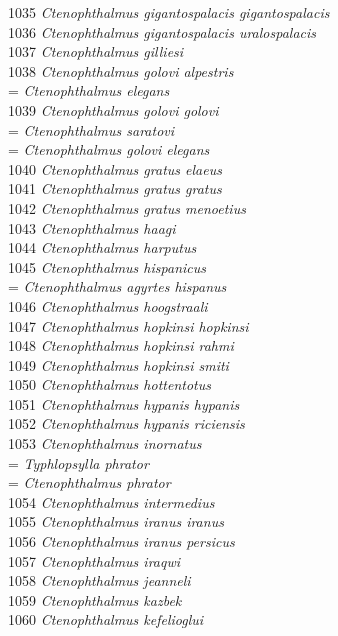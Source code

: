 \documentclass[
]{article}
\begin{document}
1035 \emph{Ctenophthalmus gigantospalacis gigantospalacis}\\
1036 \emph{Ctenophthalmus gigantospalacis uralospalacis}\\
1037 \emph{Ctenophthalmus gilliesi}\\
1038 \emph{Ctenophthalmus golovi alpestris}\\
= \emph{Ctenophthalmus elegans}\\
1039 \emph{Ctenophthalmus golovi golovi}\\
= \emph{Ctenophthalmus saratovi}\\
= \emph{Ctenophthalmus golovi elegans}\\
1040 \emph{Ctenophthalmus gratus elaeus}\\
1041 \emph{Ctenophthalmus gratus gratus}\\
1042 \emph{Ctenophthalmus gratus menoetius}\\
1043 \emph{Ctenophthalmus haagi}\\
1044 \emph{Ctenophthalmus harputus}\\
1045 \emph{Ctenophthalmus hispanicus}\\
= \emph{Ctenophthalmus agyrtes hispanus}\\
1046 \emph{Ctenophthalmus hoogstraali}\\
1047 \emph{Ctenophthalmus hopkinsi hopkinsi}\\
1048 \emph{Ctenophthalmus hopkinsi rahmi}\\
1049 \emph{Ctenophthalmus hopkinsi smiti}\\
1050 \emph{Ctenophthalmus hottentotus}\\
1051 \emph{Ctenophthalmus hypanis hypanis}\\
1052 \emph{Ctenophthalmus hypanis riciensis}\\
1053 \emph{Ctenophthalmus inornatus}\\
= \emph{Typhlopsylla phrator}\\
= \emph{Ctenophthalmus phrator}\\
1054 \emph{Ctenophthalmus intermedius}\\
1055 \emph{Ctenophthalmus iranus iranus}\\
1056 \emph{Ctenophthalmus iranus persicus}\\
1057 \emph{Ctenophthalmus iraqwi}\\
1058 \emph{Ctenophthalmus jeanneli}\\
1059 \emph{Ctenophthalmus kazbek}\\
1060 \emph{Ctenophthalmus kefelioglui}\\
\end{document}
